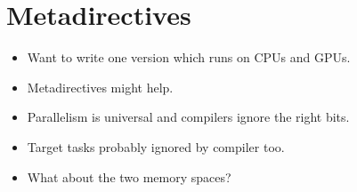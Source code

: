\section{Metadirectives}
\begin{itemize}
  \item Want to write one version which runs on CPUs and GPUs.
  \item Metadirectives might help.
  \item Parallelism is universal and compilers ignore the right bits.
  \item Target tasks probably ignored by compiler too.
  \item What about the two memory spaces?
\end{itemize}

